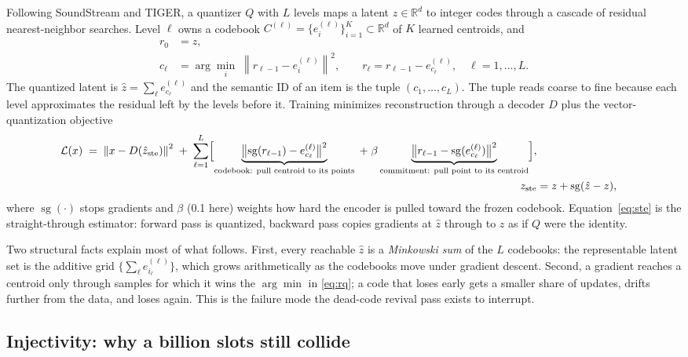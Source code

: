 \documentclass[11pt]{article}
\newcommand{\R}{\mathbb{R}}
\newcommand{\sg}{\operatorname{sg}}
\newcommand{\norm}[1]{\left\lVert #1 \right\rVert}
\begin{document}
Following SoundStream and TIGER, a quantizer $Q$ with $L$ levels maps a latent
$z \in \R^{d}$ to integer codes through a cascade of residual nearest-neighbor
searches. Level $\ell$ owns a codebook
$C^{(\ell)} = \{ e^{(\ell)}_i \}_{i=1}^{K} \subset \R^{d}$ of $K$ learned
centroids, and
\begin{align}
  r_0 &= z, \nonumber \\
  c_\ell &= \arg\min_{i} \; \norm{r_{\ell-1} - e^{(\ell)}_i}^2 ,
    \qquad
  r_\ell = r_{\ell-1} - e^{(\ell)}_{c_\ell}, \quad \ell = 1, \dots, L.
    \label{eq:rq}
\end{align}
The quantized latent is $\hat z = \sum_{\ell} e^{(\ell)}_{c_\ell}$ and the
semantic ID of an item is the tuple $(c_1, \dots, c_L)$. The tuple reads
coarse to fine because each level approximates the residual left by the levels
before it. Training minimizes reconstruction through a decoder $D$ plus the
vector-quantization objective
\begin{align}
  \mathcal{L}(x) \;=\; \norm{x - D(\hat z_{\mathrm{ste}})}^2
  \;+\; \sum_{\ell=1}^{L} \Bigl[
    \underbrace{\bigl\lVert \sg(r_{\ell-1}) - e^{(\ell)}_{c_\ell} \bigr\rVert^2}
      _{\text{codebook: pull centroid to its points}}
    \;+\; \beta \underbrace{\bigl\lVert r_{\ell-1}
      - \sg(e^{(\ell)}_{c_\ell}) \bigr\rVert^2}
      _{\text{commitment: pull point to its centroid}} \Bigr],
    \label{eq:loss}\\
  z_{\mathrm{ste}} &= z + \sg(\hat z - z), \label{eq:ste}
\end{align}
where $\sg(\cdot)$ stops gradients and $\beta$ (0.1 here) weights how hard the
encoder is pulled toward the frozen codebook. Equation~\eqref{eq:ste} is the
straight-through estimator: forward pass is quantized, backward pass copies
gradients at $\hat z$ through to $z$ as if $Q$ were the identity.

Two structural facts explain most of what follows. First, every reachable
$\hat z$ is a \emph{Minkowski sum} of the $L$ codebooks: the representable
latent set is the additive grid
$\bigl\{ \sum_\ell e^{(\ell)}_{i_\ell} \bigr\}$, which grows arithmetically as
the codebooks move under gradient descent. Second, a gradient reaches a centroid
only through samples for which it wins the $\arg\min$ in \eqref{eq:rq}; a code
that loses early gets a smaller share of updates, drifts further from the data,
and loses again. This is the failure mode the dead-code revival pass exists to
interrupt.

\subsection{Injectivity: why a billion slots still collide}
\end{document}
